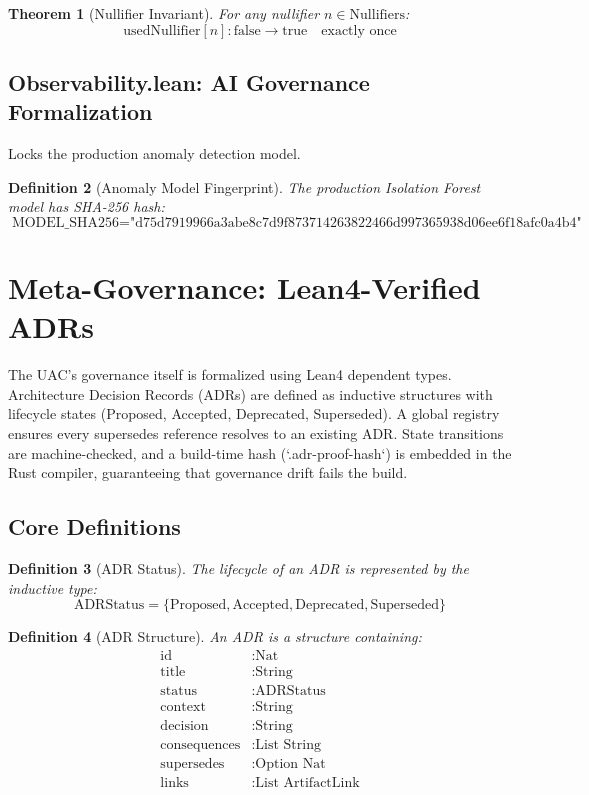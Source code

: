 \documentclass[11pt,a4paper]{article}
\newtheorem{theorem}{Theorem}[section]
\newtheorem{definition}[theorem]{Definition}
\begin{document}
\begin{theorem}[Nullifier Invariant]
For any nullifier $n \in \text{Nullifiers}$:
\[
\text{usedNullifier}[n] : \text{false} \rightarrow \text{true} \quad \text{exactly once}
\]
\end{theorem}

\subsection{Observability.lean: AI Governance Formalization}
Locks the production anomaly detection model.

\begin{definition}[Anomaly Model Fingerprint]
The production Isolation Forest model has SHA-256 hash:
\[
\text{MODEL\_SHA256} = \text{"d75d7919966a3abe8c7d9f873714263822466d997365938d06ee6f18afc0a4b4"}
\]
\end{definition}

\section{Meta-Governance: Lean4-Verified ADRs}

The UAC's governance itself is formalized using Lean4 dependent types. Architecture Decision Records (ADRs) are defined as inductive structures with lifecycle states (Proposed, Accepted, Deprecated, Superseded). A global registry ensures every supersedes reference resolves to an existing ADR. State transitions are machine-checked, and a build-time hash (`.adr-proof-hash`) is embedded in the Rust compiler, guaranteeing that governance drift fails the build.

\subsection{Core Definitions}

\begin{definition}[ADR Status]
The lifecycle of an ADR is represented by the inductive type:
\[
\text{ADRStatus} = \{\text{Proposed}, \text{Accepted}, \text{Deprecated}, \text{Superseded}\}
\]
\end{definition}

\begin{definition}[ADR Structure]
An ADR is a structure containing:
\begin{align}
    \text{id} &: \text{Nat} \\
    \text{title} &: \text{String} \\
    \text{status} &: \text{ADRStatus} \\
    \text{context} &: \text{String} \\
    \text{decision} &: \text{String} \\
    \text{consequences} &: \text{List String} \\
    \text{supersedes} &: \text{Option Nat} \\
    \text{links} &: \text{List ArtifactLink}
\end{align}
\end{definition}
\end{document}
